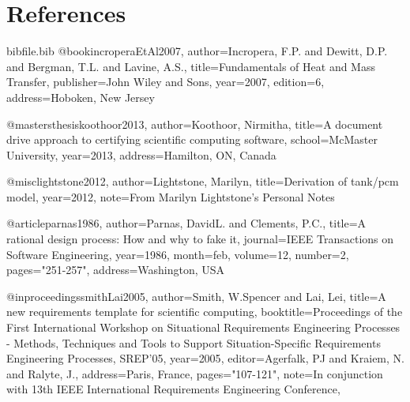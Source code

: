 \documentclass[12pt]{article}
\begin{document}
\section{References}
\label{Sec:References}
\begin{filecontents*}{bibfile.bib}
@book{incroperaEtAl2007,
author={Incropera, F.P. and Dewitt, D.P. and Bergman, T.L. and Lavine, A.S.},
title={Fundamentals of Heat and Mass Transfer},
publisher={John Wiley and Sons},
year={2007},
edition={6},
address={Hoboken, New Jersey}}

@mastersthesis{koothoor2013,
author={Koothoor, Nirmitha},
title={A document drive approach to certifying scientific computing software},
school={McMaster University},
year={2013},
address={Hamilton, ON, Canada}}

@misc{lightstone2012,
author={Lightstone, Marilyn},
title={Derivation of tank/pcm model},
year={2012},
note={From Marilyn Lightstone's Personal Notes}}

@article{parnas1986,
author={Parnas, DavidL. and Clements, P.C.},
title={A rational design process: How and why to fake it},
journal={IEEE Transactions on Software Engineering},
year={1986},
month={feb},
volume={12},
number={2},
pages={"251-257"},
address={Washington, USA}}

@inproceedings{smithLai2005,
author={Smith, W.Spencer and Lai, Lei},
title={A new requirements template for scientific computing},
booktitle={Proceedings of the First International Workshop on Situational Requirements Engineering Processes - Methods, Techniques and Tools to Support Situation-Specific Requirements Engineering Processes, SREP'05},
year={2005},
editor={Agerfalk, PJ and Kraiem, N. and Ralyte, J.},
address={Paris, France},
pages={"107-121"},
note={In conjunction with 13th IEEE International Requirements Engineering Conference,}}
\end{filecontents*}
\nocite{*}
\printbibliography[heading=none]
\end{document}
